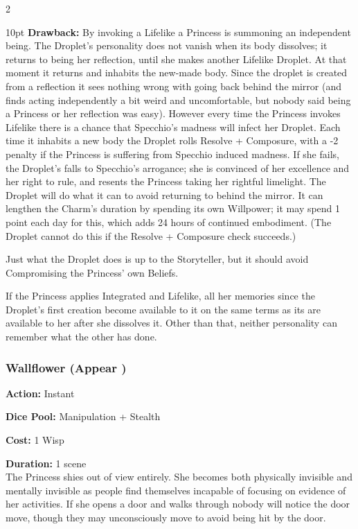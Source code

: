 \begin{multicols}{2}
\begin{myindentpar}{10pt}
\textbf{Drawback:} By invoking a Lifelike a Princess is summoning an independent being. The Droplet's personality does not vanish when its body dissolves; it returns to being her reflection, until she makes another Lifelike Droplet. At that moment it returns and inhabits the new-made body. Since the droplet is created from a reflection it sees nothing wrong with going back behind the mirror (and finds acting independently a bit weird and uncomfortable, but nobody said being a Princess or her reflection was easy). However every time the Princess invokes Lifelike there is a chance that Specchio's madness will infect her Droplet. Each time it inhabits a new body the Droplet rolls Resolve + Composure, with a -2 penalty if the Princess is suffering from Specchio induced madness. If she fails, the Droplet's falls to Specchio's arrogance; she is convinced of her excellence and her right to rule, and resents the Princess taking her rightful limelight. The Droplet will do what it can to avoid returning to behind the 
mirror. It can lengthen the Charm's duration by spending its own Willpower; it may spend 1 point each day for this, which adds 24 hours of continued embodiment. (The Droplet cannot do this if the Resolve + Composure check succeeds.) 

Just what the Droplet does is up to the Storyteller, but it should avoid Compromising the Princess' own Beliefs.

If the Princess applies Integrated and Lifelike, all her memories since the Droplet's first creation become available to it on the same terms as its are available to her after she dissolves it. Other than that, neither personality can remember what the other has done.\end{myindentpar}

\subsubsection*{Wallflower (Appear \textbullet\textbullet\textbullet)}
\noindent \textbf{Action:} Instant

\noindent \textbf{Dice Pool:} Manipulation + Stealth

\noindent \textbf{Cost:} 1 Wisp

\noindent \textbf{Duration:} 1 scene \\

\noindent The Princess shies out of view entirely. She becomes both physically invisible and mentally invisible as people find themselves incapable of focusing on evidence of her activities. If she opens a door and walks through nobody will notice the door move, though they may unconsciously move to avoid being hit by the door. 


\end{multicols}
